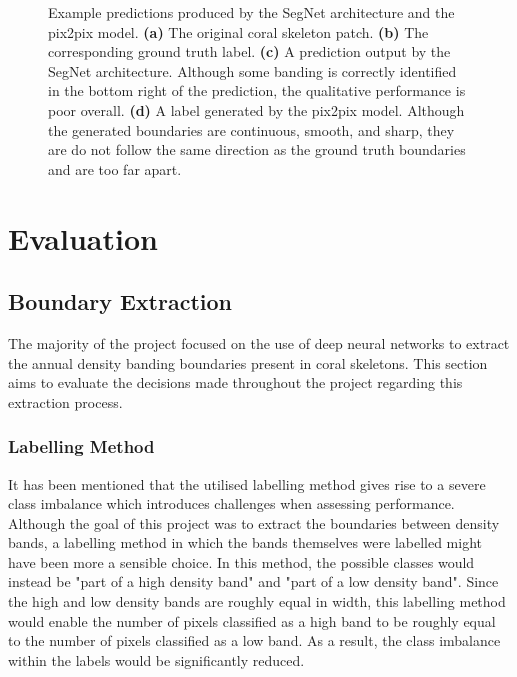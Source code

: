 \begin{figure}[!t]
\begin{subfigure}[t]{0.24\textwidth}
        \caption{}
        \label{fig:pixexample}
    \end{subfigure}
    \caption{Example predictions produced by the SegNet architecture and the pix2pix model. \textbf{(a)} The original coral skeleton patch. \textbf{(b)} The corresponding ground truth label. \textbf{(c)} A prediction output by the SegNet architecture. Although some banding is correctly identified in the bottom right of the prediction, the qualitative performance is poor overall. \textbf{(d)} A label generated by the pix2pix model. Although the generated boundaries are continuous, smooth, and sharp, they are do not follow the same direction as the ground truth boundaries and are too far apart.}
    \label{fig:segpixexample}
\end{figure}

\section{Evaluation}

\subsection{Boundary Extraction}

The majority of the project focused on the use of deep neural networks to extract the annual density banding boundaries present in coral skeletons. This section aims to evaluate the decisions made throughout the project regarding this extraction process.

\subsubsection{Labelling Method}
\label{sec:evallabel}

It has been mentioned that the utilised labelling method gives rise to a severe class imbalance which introduces challenges when assessing performance. Although the goal of this project was to extract the boundaries between density bands, a labelling method in which the bands themselves were labelled might have been more a sensible choice. In this method, the possible classes would instead be "part of a high density band" and "part of a low density band". Since the high and low density bands are roughly equal in width, this labelling method would enable the number of pixels classified as a high band to be roughly equal to the number of pixels classified as a low band. As a result, the class imbalance within the labels would be significantly reduced.

